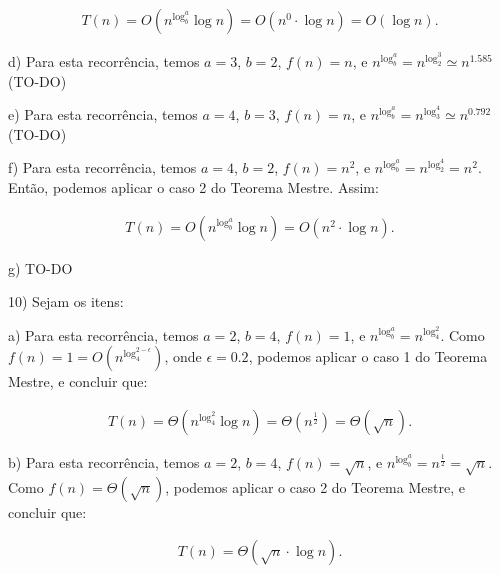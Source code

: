 \documentclass[]{article}
\begin{document}
\begin{align*}
    T(n) = O(n^{\log_b^a} \log n) = O(n^0 \cdot \log n) = O(\log n).
\end{align*}

\vspace{0.5cm}

d) Para esta recorrência, temos $a=3$, $b=2$, $f(n)=n$, e $n^{\log_b^a} = n^{\log_2^3} \simeq n^{1.585}$ (TO-DO)

\vspace{0.5cm}

e) Para esta recorrência, temos $a=4$, $b=3$, $f(n)=n$, e $n^{\log_b^a} = n^{\log_3^4} \simeq n^{0.792}$ (TO-DO)

\vspace{0.5cm}

f) Para esta recorrência, temos $a=4$, $b=2$, $f(n)=n^2$, e $n^{\log_b^a} = n^{\log_2^4} = n^2$. Então, podemos aplicar o caso 2 do Teorema Mestre. Assim:

\begin{align*}
    T(n) = O(n^{\log_b^a} \log n) = O(n^2 \cdot \log n).
\end{align*}

\vspace{0.5cm}

g) TO-DO

\vspace{1cm}

10) Sejam os itens:

a) Para esta recorrência, temos $a=2$, $b=4$, $f(n)=1$, e $n^{\log_b^a} = n^{\log_4^2}$. Como $f(n)=1 = O(n^{\log_4^{2-\epsilon}})$, onde $\epsilon = 0.2$, podemos aplicar o caso 1 do Teorema Mestre, e concluir que:

\begin{align*}
    T(n) = \Theta(n^{\log_4^2} \log n) = \Theta(n^{\frac{1}{2}}) = \Theta(\sqrt{n}).
\end{align*}

\vspace{0.5cm}

b) Para esta recorrência, temos $a=2$, $b=4$, $f(n)=\sqrt{n}$, e $n^{\log_b^a} = n^{\frac{1}{2}} = \sqrt{n}$. Como $f(n)=\Theta(\sqrt{n})$, podemos aplicar o caso 2 do Teorema Mestre, e concluir que:

\begin{align*}
    T(n) = \Theta(\sqrt{n} \cdot \log n).
\end{align*}

\vspace{0.5cm}
\end{document}
